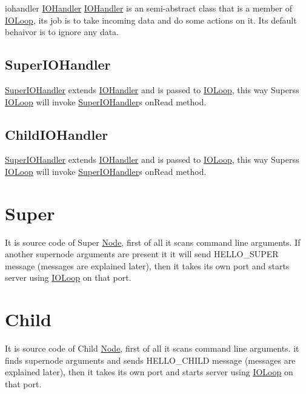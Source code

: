 iohandler \hyperlink{classIOHandler}{I\+O\+Handler} \hyperlink{classIOHandler}{I\+O\+Handler} is an semi-\/abstract class that is a member of \hyperlink{classIOLoop}{I\+O\+Loop}, its job is to take incoming data and do some actions on it. Its default behaivor is to ignore any data.\hypertarget{index_siohandler}{}\subsection{Super\+I\+O\+Handler}\label{index_siohandler}
\hyperlink{classSuperIOHandler}{Super\+I\+O\+Handler} extends \hyperlink{classIOHandler}{I\+O\+Handler} and is passed to \hyperlink{classIOLoop}{I\+O\+Loop}, this way Supers\textquotesingle{}s \hyperlink{classIOLoop}{I\+O\+Loop} will invoke \hyperlink{classSuperIOHandler}{Super\+I\+O\+Handler}\textquotesingle{}s on\+Read method.\hypertarget{index_ciohadnler}{}\subsection{Child\+I\+O\+Handler}\label{index_ciohadnler}
\hyperlink{classSuperIOHandler}{Super\+I\+O\+Handler} extends \hyperlink{classIOHandler}{I\+O\+Handler} and is passed to \hyperlink{classIOLoop}{I\+O\+Loop}, this way Supers\textquotesingle{}s \hyperlink{classIOLoop}{I\+O\+Loop} will invoke \hyperlink{classSuperIOHandler}{Super\+I\+O\+Handler}\textquotesingle{}s on\+Read method.\hypertarget{index_Super}{}\section{Super}\label{index_Super}
It is source code of Super \hyperlink{structNode}{Node}, first of all it scans command line arguments. If another supernode arguments are present it it will send H\+E\+L\+L\+O\+\_\+\+S\+U\+P\+ER message (messages are explained later), then it takes its own port and starts server using \hyperlink{classIOLoop}{I\+O\+Loop} on that port.\hypertarget{index_Child}{}\section{Child}\label{index_Child}
It is source code of Child \hyperlink{structNode}{Node}, first of all it scans command line arguments. it finds supernode arguments and sends H\+E\+L\+L\+O\+\_\+\+C\+H\+I\+LD message (messages are explained later), then it takes its own port and starts server using \hyperlink{classIOLoop}{I\+O\+Loop} on that port. 